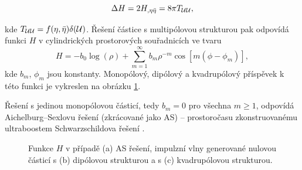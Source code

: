 \begin{equation}
    \label{eq:podminka_na_H}
    \Delta H = 2 H_{,\eta \bar{\eta}} = 8 \pi T_{\mathcal{U} \mathcal{U}},
\end{equation}
 
kde $T_{\mathcal{U} \mathcal{U}} = f(\eta, \bar{\eta}) \delta(\mathcal{U})$. Řešení částice s multipólovou strukturou pak odpovídá funkci $H$ v cylindrických prostorových souřadnicích ve tvaru
\begin{equation}
    \label{eq:multipole_minkowski}
    H = -b_0 \log(\rho) + \sum_{m=1}^\infty b_m \rho^{-m} \cos\left[ m \left(\phi - \phi_m \right) \right],
\end{equation}
kde $b_m$, $\phi_m$ jsou konstanty. Monopólový, dipólový a kvadrupólový příspěvek k této funkci je vykreslen na obrázku \ref{fig:mono_di_kvadru}.

Řešení s jedinou monopólovou částicí, tedy $b_m=0$ pro všechna $m \geq 1$, odpovídá Aichelburg--Sexlovu řešení (zkrácované jako AS) -- prostoročasu
zkonstruovanému ultraboostem Schwarzschildova řešení \cite{Aichelburg_1971}.

\begin{figure}[ht]
    \centering
    \begin{subfigure}[b]{0.32\textwidth}
       \caption{}
    \end{subfigure}
     \hfill
     \begin{subfigure}[b]{0.32\textwidth}
       \caption{}
     \end{subfigure}
     \hfill
     \begin{subfigure}[b]{0.32\textwidth}
       \caption{}
     \end{subfigure}
    \caption{Funkce $H$ v případě (a) AS řešení, impulzní vlny generované nulovou částicí s (b) dipólovou strukturou a s (c) kvadrupólovou strukturou.}
    \label{fig:mono_di_kvadru}
\end{figure}

